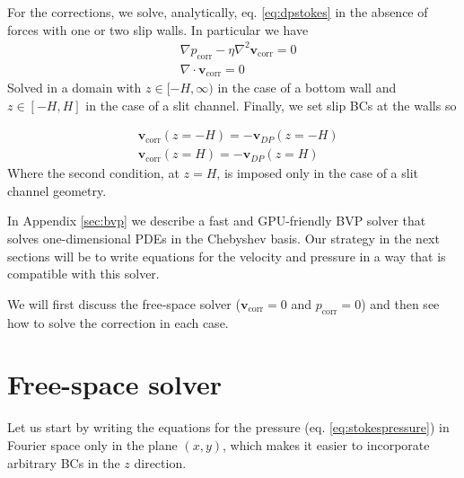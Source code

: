 \documentclass[ twoside,openright,titlepage,numbers=noenddot,%
headinclude,footinclude,cleardoublepage=empty,abstract=on,
BCOR=5mm,paper=a4,fontsize=11pt, dvipsnames
]{scrreprt}
\renewcommand{\vec}[1]{\bm{#1}}
\newcommand{\gpu}{\gls{GPU}\xspace}
\newcommand{\fvel}{v}
\newcommand{\corr}{\text{corr}}
\begin{document}
For the corrections, we solve, analytically, eq. \eqref{eq:dpstokes} in the absence of forces with one or two slip walls. In particular we have
\begin{equation}
  \label{eq:dpstokescorr}
\begin{aligned}
    &\nabla p_{\corr} - \eta\nabla^2\vec{\fvel}_{\corr} = 0\\
    &\nabla\cdot\vec{\fvel}_{\corr} = 0  
\end{aligned}
\end{equation}
Solved in a domain with $z\in [-H,\infty)$ in the case of a bottom wall and $z\in [-H, H]$ in the case of a slit channel. Finally, we set slip \glspl{BC} at the walls so

\begin{equation}
  \label{eq:dpstokescorrbcs}
  \begin{aligned}
    &\vec{\fvel}_{\corr}(z=-H) = -\vec{\fvel}_{DP}(z=-H)\\
    &\vec{\fvel}_{\corr}(z=H) = -\vec{\fvel}_{DP}(z=H)    
\end{aligned}
\end{equation}
Where the second condition, at $z=H$, is imposed only in the case of a slit channel geometry.

In Appendix \ref{sec:bvp} we describe a fast and \gpu-friendly \gls{BVP} solver that solves one-dimensional \glspl{PDE} in the Chebyshev basis. Our strategy in the next sections will be to write equations for the velocity and pressure in a way that is compatible with this solver.

We will first discuss the free-space solver ($\vec{\fvel}_{\corr} = 0$ and $p_\corr=0$) and then see how to solve the correction in each case. 
\section{Free-space solver}
Let us start by writing the equations for the pressure (eq. \eqref{eq:stokespressure}) in Fourier space only in the plane $(x,y)$, which makes it easier to incorporate arbitrary \glspl{BC} in the $z$ direction.
\end{document}
